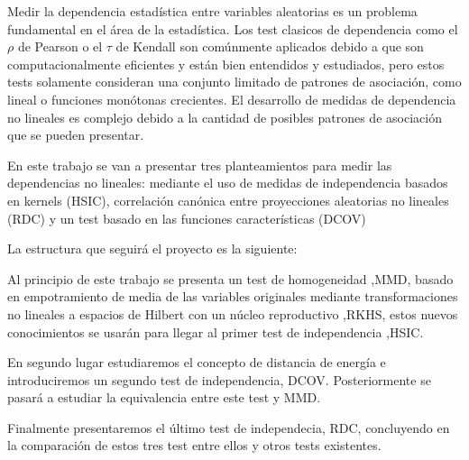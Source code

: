 Medir la dependencia estadística entre variables aleatorias es un problema fundamental en el área de la estadística.
Los test clasicos de dependencia como el $\rho$ de Pearson o el $\tau$ de Kendall son comúnmente aplicados debido a que son computacionalmente eficientes y están bien entendidos y estudiados, pero estos tests solamente consideran una conjunto limitado de patrones de asociación, como lineal o funciones monótonas crecientes. El desarrollo de medidas de dependencia no lineales es complejo debido a la cantidad de posibles patrones de asociación que se pueden presentar.

En este trabajo se van a presentar tres planteamientos para medir las dependencias no lineales: mediante el uso de medidas de independencia basados en kernels (HSIC), correlación canónica entre proyecciones aleatorias no lineales (RDC) y un test basado en las funciones características (DCOV)

La estructura que seguirá el proyecto es la siguiente:

Al principio de este trabajo se presenta un test de homogeneidad ,MMD, basado en empotramiento de media de las variables originales mediante transformaciones no lineales a espacios de Hilbert con un núcleo reproductivo ,RKHS, estos nuevos conocimientos se usarán para llegar al primer test de independencia ,HSIC.

En segundo lugar estudiaremos el concepto de distancia de energía e introduciremos un segundo test de independencia, DCOV. Posteriormente se pasará a estudiar la equivalencia entre este test y MMD.

Finalmente presentaremos el último test de independecia, RDC, concluyendo en la comparación de estos tres test entre ellos y otros tests existentes.




